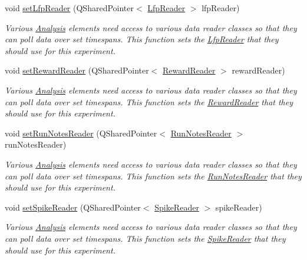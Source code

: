 \begin{DoxyCompactItemize}
void \hyperlink{class_picto_1_1_design_config_acb63659543f4e34d235330727bb002f1}{set\-Lfp\-Reader} (Q\-Shared\-Pointer$<$ \hyperlink{class_picto_1_1_lfp_reader}{Lfp\-Reader} $>$ lfp\-Reader)
\begin{DoxyCompactList}\small\item\em Various \hyperlink{class_picto_1_1_analysis}{Analysis} elements need access to various data reader classes so that they can poll data over set timespans. This function sets the \hyperlink{class_picto_1_1_lfp_reader}{Lfp\-Reader} that they should use for this experiment. \end{DoxyCompactList}\item 
void \hyperlink{class_picto_1_1_design_config_acd8d9a6bc5cbb7272b3b6f7c1b4e3e2e}{set\-Reward\-Reader} (Q\-Shared\-Pointer$<$ \hyperlink{class_picto_1_1_reward_reader}{Reward\-Reader} $>$ reward\-Reader)
\begin{DoxyCompactList}\small\item\em Various \hyperlink{class_picto_1_1_analysis}{Analysis} elements need access to various data reader classes so that they can poll data over set timespans. This function sets the \hyperlink{class_picto_1_1_reward_reader}{Reward\-Reader} that they should use for this experiment. \end{DoxyCompactList}\item 
void \hyperlink{class_picto_1_1_design_config_aae77d7b39d65dfd4d7c949414ea9953d}{set\-Run\-Notes\-Reader} (Q\-Shared\-Pointer$<$ \hyperlink{class_picto_1_1_run_notes_reader}{Run\-Notes\-Reader} $>$ run\-Notes\-Reader)
\begin{DoxyCompactList}\small\item\em Various \hyperlink{class_picto_1_1_analysis}{Analysis} elements need access to various data reader classes so that they can poll data over set timespans. This function sets the \hyperlink{class_picto_1_1_run_notes_reader}{Run\-Notes\-Reader} that they should use for this experiment. \end{DoxyCompactList}\item 
void \hyperlink{class_picto_1_1_design_config_a4a00a01101228bf27842fe4e40e30c66}{set\-Spike\-Reader} (Q\-Shared\-Pointer$<$ \hyperlink{class_picto_1_1_spike_reader}{Spike\-Reader} $>$ spike\-Reader)
\begin{DoxyCompactList}\small\item\em Various \hyperlink{class_picto_1_1_analysis}{Analysis} elements need access to various data reader classes so that they can poll data over set timespans. This function sets the \hyperlink{class_picto_1_1_spike_reader}{Spike\-Reader} that they should use for this experiment. \end{DoxyCompactList}\item 

\end{DoxyCompactItemize}
